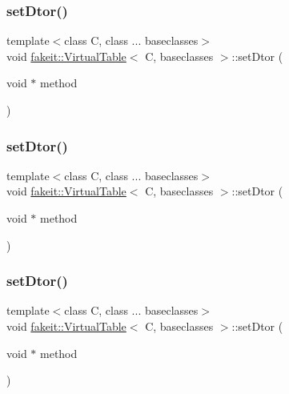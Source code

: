 \subsubsection{\texorpdfstring{setDtor()}{setDtor()}\hspace{0.1cm}{\footnotesize\ttfamily [7/10]}}
{\footnotesize\ttfamily template$<$class C, class ... baseclasses$>$ \\
void \mbox{\hyperlink{structfakeit_1_1VirtualTable}{fakeit\+::\+Virtual\+Table}}$<$ C, baseclasses $>$\+::set\+Dtor (\begin{DoxyParamCaption}\item[{void $\ast$}]{method }\end{DoxyParamCaption})\hspace{0.3cm}{\ttfamily [inline]}}

\mbox{\label{structfakeit_1_1VirtualTable_adee13076280ff9bd4c06b5f1e62d6708}} 
\subsubsection{\texorpdfstring{setDtor()}{setDtor()}\hspace{0.1cm}{\footnotesize\ttfamily [8/10]}}
{\footnotesize\ttfamily template$<$class C, class ... baseclasses$>$ \\
void \mbox{\hyperlink{structfakeit_1_1VirtualTable}{fakeit\+::\+Virtual\+Table}}$<$ C, baseclasses $>$\+::set\+Dtor (\begin{DoxyParamCaption}\item[{void $\ast$}]{method }\end{DoxyParamCaption})\hspace{0.3cm}{\ttfamily [inline]}}

\mbox{\label{structfakeit_1_1VirtualTable_adee13076280ff9bd4c06b5f1e62d6708}} 
\subsubsection{\texorpdfstring{setDtor()}{setDtor()}\hspace{0.1cm}{\footnotesize\ttfamily [9/10]}}
{\footnotesize\ttfamily template$<$class C, class ... baseclasses$>$ \\
void \mbox{\hyperlink{structfakeit_1_1VirtualTable}{fakeit\+::\+Virtual\+Table}}$<$ C, baseclasses $>$\+::set\+Dtor (\begin{DoxyParamCaption}\item[{void $\ast$}]{method }\end{DoxyParamCaption})\hspace{0.3cm}{\ttfamily [inline]}}

